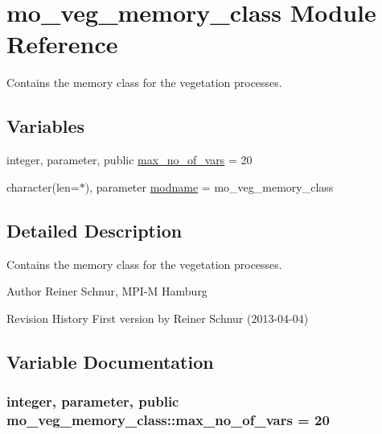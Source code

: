 \hypertarget{namespacemo__veg__memory__class}{}\section{mo\+\_\+veg\+\_\+memory\+\_\+class Module Reference}
\label{namespacemo__veg__memory__class}


Contains the memory class for the vegetation processes.  


\subsection*{Variables}
\begin{DoxyCompactItemize}
\item 
integer, parameter, public \hyperlink{namespacemo__veg__memory__class_a4e9663c4612a17a86ffc9ac33644edc2}{max\+\_\+no\+\_\+of\+\_\+vars} = 20
\item 
character(len=$\ast$), parameter \hyperlink{namespacemo__veg__memory__class_a636c20bbb0af5d76979ff7931ab402d2}{modname} = \textquotesingle{}mo\+\_\+veg\+\_\+memory\+\_\+class\textquotesingle{}
\end{DoxyCompactItemize}


\subsection{Detailed Description}
Contains the memory class for the vegetation processes. 

\begin{DoxyAuthor}{Author}
Reiner Schnur, M\+P\+I-\/\+M Hamburg
\end{DoxyAuthor}
\begin{DoxyParagraph}{Revision History}
First version by Reiner Schnur (2013-\/04-\/04) 
\end{DoxyParagraph}


\subsection{Variable Documentation}
\hypertarget{namespacemo__veg__memory__class_a4e9663c4612a17a86ffc9ac33644edc2}{}
\subsubsection[{max\+\_\+no\+\_\+of\+\_\+vars}]{\setlength{\rightskip}{0pt plus 5cm}integer, parameter, public mo\+\_\+veg\+\_\+memory\+\_\+class\+::max\+\_\+no\+\_\+of\+\_\+vars = 20}\label{namespacemo__veg__memory__class_a4e9663c4612a17a86ffc9ac33644edc2}



